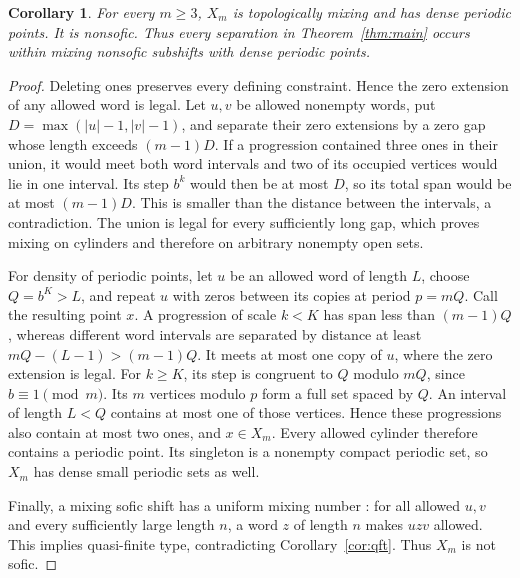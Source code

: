 \documentclass[11pt]{article}
\newtheorem{corollary}[theorem]{Corollary}
\begin{document}
\begin{corollary}\label{cor:mixing}
For every $m\geq3$, $X_m$ is topologically mixing and has dense periodic
points. It is nonsofic. Thus every separation in Theorem~\ref{thm:main}
occurs within mixing nonsofic subshifts with dense periodic points.
\end{corollary}
\begin{proof}
Deleting ones preserves every defining constraint. Hence the zero
extension of any allowed word is legal. Let $u,v$ be allowed nonempty
words, put $D=\max(|u|-1,|v|-1)$, and separate their zero extensions by
a zero gap whose length exceeds $(m-1)D$. If a progression contained
three ones in their union, it would meet both word intervals and two of
its occupied vertices would lie in one interval. Its step $b^k$ would
then be at most $D$, so its total span would be at most $(m-1)D$.
This is smaller than the distance between the intervals, a contradiction.
The union is legal for every sufficiently long gap, which proves mixing
on cylinders and therefore on arbitrary nonempty open sets.

For density of periodic points, let $u$ be an allowed word of length
$L$, choose $Q=b^K>L$, and repeat $u$ with zeros between its copies at
period $p=mQ$. Call the resulting point $x$. A progression of scale
$k<K$ has span less than $(m-1)Q$, whereas different word intervals are
separated by distance at least $mQ-(L-1)>(m-1)Q$. It meets at most one
copy of $u$, where the zero extension is legal. For $k\geq K$, its step
is congruent to $Q$ modulo $mQ$, since $b\equiv1\pmod m$. Its $m$
vertices modulo $p$ form a full set spaced by $Q$. An interval of length
$L<Q$ contains at most one of those vertices. Hence these progressions
also contain at most two ones, and $x\in X_m$. Every allowed cylinder
therefore contains a periodic point. Its singleton is a nonempty compact
periodic set, so $X_m$ has dense small periodic sets as well.

Finally, a mixing sofic shift has a uniform mixing number
\cite[Proposition 2.3]{MS}: for all allowed $u,v$ and every sufficiently
large length $n$, a word $z$ of length $n$ makes $uzv$ allowed.
This implies quasi-finite type, contradicting Corollary~\ref{cor:qft}.
Thus $X_m$ is not sofic.
\end{proof}
\end{document}
